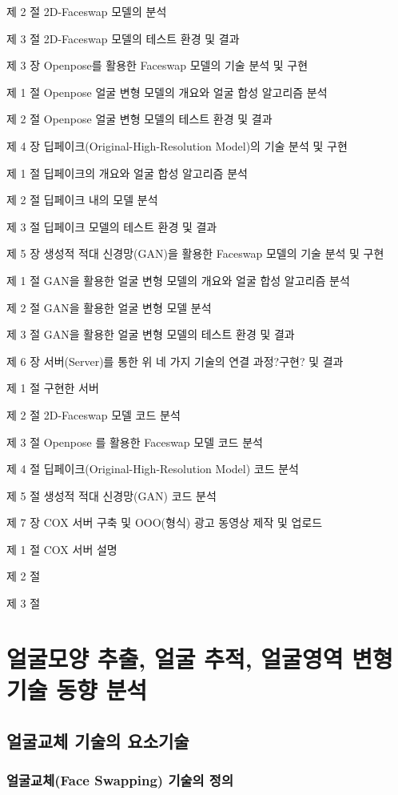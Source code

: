 제  2  절 2D-Faceswap 모델의 분석

제  3  절 2D-Faceswap 모델의 테스트 환경 및 결과

제  3  장 Openpose를 활용한 Faceswap 모델의 기술 분석 및 구현

제  1  절 Openpose 얼굴 변형 모델의 개요와 얼굴 합성 알고리즘 분석

제  2  절 Openpose 얼굴 변형 모델의 테스트 환경 및 결과

제  4  장 딥페이크(Original-High-Resolution Model)의 기술 분석 및 구현

제  1  절 딥페이크의 개요와 얼굴 합성 알고리즘 분석

제  2  절 딥페이크 내의 모델 분석

제  3  절 딥페이크 모델의 테스트 환경 및 결과

제  5  장 생성적 적대 신경망(GAN)을 활용한 Faceswap 모델의 기술 분석 및 구현

제  1  절 GAN을 활용한 얼굴 변형 모델의 개요와 얼굴 합성 알고리즘 분석

제  2  절 GAN을 활용한 얼굴 변형 모델 분석

제  3  절 GAN을 활용한 얼굴 변형 모델의 테스트 환경 및 결과

제  6  장 서버(Server)를 통한 위 네 가지 기술의  연결 과정?구현? 및 결과  

제  1  절 구현한 서버 

제  2  절 2D-Faceswap 모델 코드 분석

제  3  절 Openpose 를 활용한 Faceswap 모델 코드 분석

제  4  절 딥페이크(Original-High-Resolution Model) 코드 분석

제  5  절 생성적 적대 신경망(GAN) 코드 분석

제  7  장 COX 서버 구축 및 OOO(형식) 광고 동영상 제작 및 업로드

제  1  절 COX 서버 설명

제  2  절 

제  3  절 

\chapter{얼굴모양 추출, 얼굴 추적, 얼굴영역 변형 기술 동향 분석 }

\section{얼굴교체 기술의 요소기술}

\subsection{ 얼굴교체(Face Swapping) 기술의 정의}

